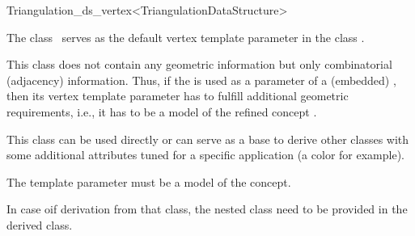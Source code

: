 \begin{ccRefClass}{Triangulation_ds_vertex<TriangulationDataStructure>}

\ccDefinition

The class \ccRefName\ serves as the default vertex template parameter in the
class .

This class does not contain any geometric information but only combinatorial
(adjacency) information. Thus, if the  is
used as a parameter of a (embedded) , then its vertex template parameter
has to fulfill additional geometric requirements, {i.e.}, it has to be a
model of the refined concept .

This class can be used directly or can serve as a base to derive other classes
with some additional attributes tuned for a specific application (a color for
example).


\ccParameters

The template parameter  must be a model of the
 concept.

\ccIsModel




\begin{ccAdvanced}
In case oif derivation from that class, the nested class
 need to be provided in  the derived class.
\end{ccAdvanced}



\ccSeeAlso

\\
\end{ccRefClass}
